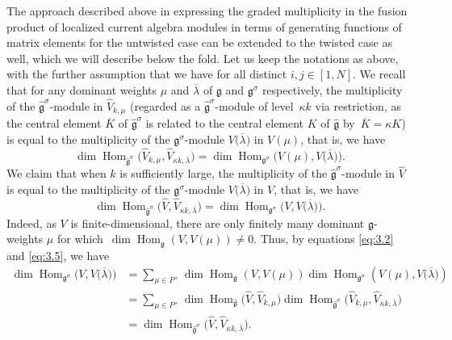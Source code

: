 \documentclass[10pt,a4paper]{amsart}
\numberwithin{equation}{section}
\DeclareMathOperator{\Hom}{Hom}
\begin{document}
The approach described above in expressing the graded multiplicity in the fusion product of localized current algebra modules in terms of generating functions of matrix elements for the untwisted case can be extended to the twisted case as well, which we will describe below the fold. Let us keep the notations as above, with the further assumption that we have  for all distinct $i,j\in[1,N]$. We recall that for any dominant weights $\mu$ and $\overline{\lambda}$ of $\mathfrak{g}$ and $\mathfrak{g}^{\sigma}$ respectively, the multiplicity of the $\widehat{\mathfrak{g}}^{\sigma}$-module  in $\widehat{V}_{k,\mu}$ (regarded as a $\widehat{\mathfrak{g}}^{\sigma}$-module of level~$\kappa k$ via restriction, as the central element $\overline{K}$ of $\widehat{\mathfrak{g}}^{\sigma}$ is related to the central element $K$ of $\widehat{\mathfrak{g}}$ by~${\overline{K}= \kappa K}$) is equal to the multiplicity of the $\mathfrak{g}^{\sigma}$-module $V\bigl(\overline{\lambda}\bigr)$ in $V(\mu)$, that is, we have
\begin{equation}\label{eq:3.5}
\dim\Hom_{\widehat{\mathfrak{g}}^{\sigma}}\bigl(\widehat{V}_{k,\mu},\widehat{V}_{\kappa k,\overline{\lambda}}\bigr)=\dim \Hom_{\mathfrak{g}^{\sigma}}\bigl(V(\mu),V\bigl(\overline{\lambda}\bigr)\bigr).
\end{equation}
We claim that when $k$ is sufficiently large, the multiplicity of the $\widehat{\mathfrak{g}}^{\sigma}$-module  in $\widehat{V}$ is equal to the multiplicity of the $\mathfrak{g}^{\sigma}$-module $V\bigl(\overline{\lambda}\bigr)$ in $V$, that is, we have
\begin{equation*}
\dim\Hom_{\widehat{\mathfrak{g}}^{\sigma}}\bigl(\widehat{V},\widehat{V}_{\kappa k,\overline{\lambda}}\bigr)=\dim \Hom_{\mathfrak{g}^{\sigma}}\bigl(V, V\bigl(\overline{\lambda}\bigr)\bigr).
\end{equation*}
Indeed, as $V$ is finite-dimensional, there are only finitely many dominant $\mathfrak{g}$-weights $\mu$ for which~${\dim\Hom_{\mathfrak{g}}(V, V(\mu))\neq 0}$. Thus, by equations \eqref{eq:3.2} and \eqref{eq:3.5}, we have
\begin{align*}
\dim \Hom_{\mathfrak{g}^{\sigma}}\bigl(V, V\bigl(\overline{\lambda}\bigr)\bigr)
&=\sum_{\mu\in P^+}\dim\Hom_{\mathfrak{g}}(V, V(\mu))\dim \Hom_{\mathfrak{g}^{\sigma}}(V(\mu), V\bigl(\overline{\lambda}\bigr))\\
&=\sum_{\mu\in P^+}\dim\Hom_{\widehat{\mathfrak{g}}}\bigl(\widehat{V},\widehat{V}_{k,\mu}\bigr)\dim\Hom_{\widehat{\mathfrak{g}}^{\sigma}}\bigl(\widehat{V}_{k,\mu},\widehat{V}_{\kappa k,\overline{\lambda}}\bigr)\\
&=\dim\Hom_{\widehat{\mathfrak{g}}^{\sigma}}\bigl(\widehat{V},\widehat{V}_{\kappa k,\overline{\lambda}}\bigr).
\end{align*}
\end{document}
